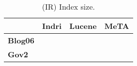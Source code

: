 \begin{table}[t]
\centering
{\small
\begin{tabular}{|l|r|r|r|}
    \hline & \textbf{Indri} & \textbf{Lucene} & \textbf{MeTA} \\
    \hline
    \textbf{Blog06} & & & \\
    \textbf{Gov2} & & & \\
    \hline
\end{tabular}
\caption{(IR) Index size.}
}
\label{table:ir-index-size}
\end{table}
